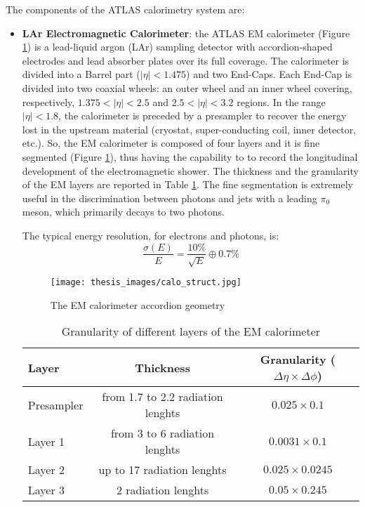 \documentclass[a4paper, oneside, 11pt, openright]{book}
\begin{document}
				The components of the ATLAS calorimetry system are:
				\begin{itemize}
					\item \textbf{LAr Electromagnetic Calorimeter}: the ATLAS EM calorimeter \cite{LArCalo_report} (Figure \ref{fig:calo struct}) is a lead-liquid argon (LAr) sampling detector with accordion-shaped electrodes and lead absorber plates over its full coverage. The calorimeter is divided into a Barrel part ($|\eta|<1.475$) and two End-Caps. Each End-Cap is divided into two coaxial wheels: an outer wheel and an inner wheel covering, respectively, $1.375<|\eta|<2.5$ and $2.5<|\eta|<3.2$ regions. 
					In the range $|\eta|<1.8$, the calorimeter is preceded by a presampler to recover the energy lost in the upstream material (cryostat, super-conducting coil, inner detector, etc.). So, the EM calorimeter is composed of four layers and it is fine segmented (Figure \ref{fig:calo struct}), thus having the capability to to record the longitudinal development of the electromagnetic shower. The thickness and the granularity of the EM layers are reported in Table \ref{tab:LAr_sample}. The fine segmentation is extremely useful in the discrimination between photons and jets with a leading $\pi_0$ meson, which primarily decays to two photons.
					
					The typical energy resolution, for electrons and photons, is:
					$$ 
					\frac{\sigma(E)}{E} = \frac{10\%}{\sqrt{E}} \oplus 0.7\%
					$$
					
					\begin{figure}
						\centering
						\texttt{[image: thesis\_images/calo\_struct.jpg]}
						\caption{The EM calorimeter accordion geometry}
						\label{fig:calo struct}
					\end{figure}
					\begin{table}
						\centering
						\begin{tabular}{lcc}
							\toprule[1.5pt]
							\textbf{Layer} & \textbf{Thickness}	& \textbf{Granularity ($\Delta\eta \times \Delta\phi$)} \\
							\midrule
							Presampler 	& from 1.7 to 2.2 radiation lenghts	& $0.025 \times 0.1$ \\
							Layer 1 	& from 3 to 6 radiation lenghts	& $0.0031 \times 0.1$ \\
							Layer 2 	& up to 17 radiation lenghts	& $0.025 \times 0.0245$ \\
							Layer 3 	& 2 radiation lenghts	& $0.05 \times 0.245$ \\
							\bottomrule[1.5pt]
						\end{tabular}
						\caption{Granularity of different layers of the EM calorimeter}\label{tab:granularity}
						\label{tab:LAr_sample}
					\end{table}


\end{itemize}
\end{document}
